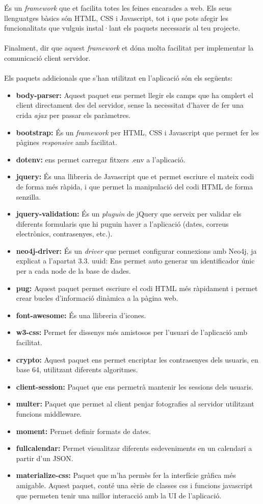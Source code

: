 \documentclass[11pt,catalan,listoffigures,listoftables]{tfgetsinf}
\begin{document}
És un \textit{framework} que et facilita totes les feines encarades a web. Els seus llenguatges bàsics són HTML, CSS i Javascript, tot i que pots afegir les funcionalitats que vulguis instal·lant els paquets necessaris al teu projecte.\\ \\
Finalment, dir que aquest \textit{framework} et dóna molta facilitat per implementar la comunicació client servidor.\\ \\
Els paquets addicionals que s'han utilitzat en l'aplicació són els següents:

\begin{itemize}
\item \textbf{body-parser:} Aquest paquet ens permet llegir els camps que ha omplert el client directament des del servidor, sense la necessitat d'haver de fer una crida \textit{ajax} per passar els paràmetres.
\item \textbf{bootstrap:} És un \textit{framework} per HTML, CSS i Javascript que permet fer les pàgines \textit{responsive} amb facilitat.
\item \textbf{dotenv:} ens permet carregar fitxers .env a l'aplicació.
\item \textbf{jquery:} És una llibreria de Javascript que et permet escriure el mateix codi de forma més ràpida, i que permet la manipulació del codi HTML de forma senzilla.
\item \textbf{jquery-validation:} És un \textit{pluguin} de jQuery que serveix per validar els diferents formularis que hi puguin haver a l'aplicació (dates, correus electrònics, contrasenyes, etc.).
\item \textbf{neo4j-driver:} És un \textit{driver} que permet configurar connexions amb Neo4j, ja explicat a l'apartat 3.3.
uuid: Ens permet auto generar un identificador únic per a cada node de la base de dades.
\item \textbf{pug:} Aquest paquet permet escriure el codi HTML més ràpidament i permet crear bucles d'informació dinàmica a la pàgina web.
\item \textbf{font-awesome:} És una llibreria d'icones.
\item \textbf{w3-css:} Permet fer dissenys més amistosos per l'usuari de l'aplicació amb facilitat.
\item \textbf{crypto:} Aquest paquet ens permet encriptar les contrasenyes dels usuaris, en base 64, utilitzant diferents algoritmes.
\item \textbf{client-session:} Paquet que ens permetrà mantenir les sessions dels usuaris.
\item \textbf{multer:} Paquet que permet al client penjar fotografies al servidor utilitzant funcions middleware.
\item \textbf{moment:} Permet definir formats de dates.
\item \textbf{fullcalendar:} Permet visualitzar diferents esdeveniments en un calendari a partir d'un JSON.
\item \textbf{materialize-css:} Paquet que m'ha permès fer la interfície gràfica més amigable. Aquest paquet, conté una sèrie de classes css i funcions javascript que permeten tenir una millor interacció amb la UI de l'aplicació.


\end{itemize}
\end{document}
